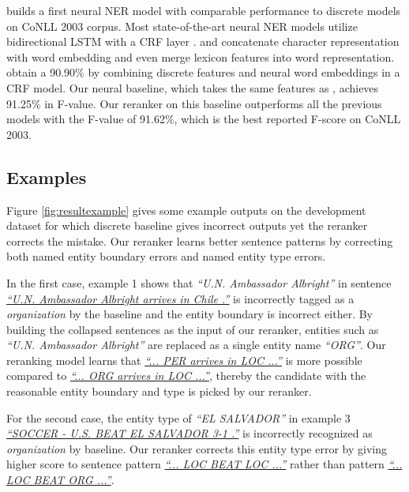 \documentclass[11pt,a4paper]{article}
\begin{document}
\citet{collobert2011natural} builds a first neural NER model with comparable performance to discrete models on CoNLL 2003 corpus. Most state-of-the-art neural NER models utilize bidirectional LSTM with a CRF layer \cite{huang2015bidirectional}. \citet{lample2016neural} and \citet{ma2016end} concatenate character representation with word embedding and \citet{chiu2015named} even merge lexicon features into word representation. \citet{passos2014lexicon} obtain a 90.90\% by combining discrete features and neural word embeddings in a CRF model. Our neural baseline, which takes the same features as \citet{ma2016end}, achieves 91.25\% in F-value. Our reranker on this baseline outperforms all the previous models with the F-value of 91.62\%, which is the best reported F-score on CoNLL 2003. 






\subsection{Examples}
Figure \ref{fig:resultexample} gives some example outputs on the development dataset for which discrete baseline gives incorrect outputs yet the reranker corrects the mistake. Our reranker learns better sentence patterns by correcting both named entity boundary errors and named entity type errors. 

In the first case, example 1 shows that \textit{``U.N. Ambassador Albright''} in sentence \textit{\ul{``U.N. Ambassador Albright arrives in Chile .''}} is incorrectly tagged as a \textit{organization} by the baseline and the entity boundary is incorrect either. By building the collapsed sentences as the input of our reranker, entities such as \textit{``U.N. Ambassador Albright''} are replaced as a single entity name \textit{``ORG''}. Our reranking model learns that \textit{\ul{``... PER arrives in LOC ...''}} is more possible compared to \textit{\ul{``... ORG arrives in LOC ...''}}, thereby the candidate with the reasonable entity boundary and type is picked by our reranker.


For the second case, the entity type of \textit{``EL SALVADOR''} in example 3 \textit{\ul{``SOCCER - U.S. BEAT EL SALVADOR 3-1 .''}} is incorrectly recognized as \textit{organization} by baseline. Our reranker corrects this entity type error by giving higher score to sentence pattern \textit{\ul{``... LOC BEAT LOC ...''}} rather than pattern \textit{\ul{``... LOC BEAT ORG ...''}}. 
\end{document}

